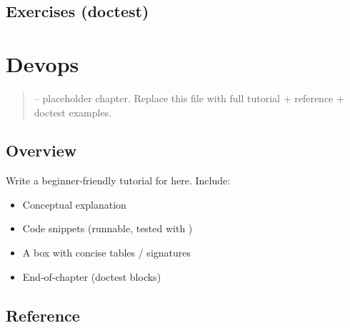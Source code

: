 \documentclass[a4paper,11pt,english]{sphinxmanual}
\begin{document}
\subsection{Exercises (doctest)}
\label{\detokenize{third_party/databases:exercises-doctest}}
\begin{sphinxVerbatim}[commandchars=\\\{\}]
\end{sphinxVerbatim}

\sphinxstepscope


\section{Devops}
\label{\detokenize{third_party/devops:devops}}\label{\detokenize{third_party/devops::doc}}\begin{quote}

\sphinxAtStartPar
{} – placeholder chapter. Replace this file with full tutorial + reference + doctest examples.
\end{quote}


\subsection{Overview}
\label{\detokenize{third_party/devops:overview}}
\sphinxAtStartPar
Write a beginner‑friendly tutorial for  here. Include:
\begin{itemize}
\item {} 
\sphinxAtStartPar
Conceptual explanation

\item {} 
\sphinxAtStartPar
Code snippets (runnable, tested with )

\item {} 
\sphinxAtStartPar
A  box with concise tables / signatures

\item {} 
\sphinxAtStartPar
End‑of‑chapter  (doctest blocks)

\end{itemize}


\subsection{Reference}
\label{\detokenize{third_party/devops:reference}}
\end{document}
